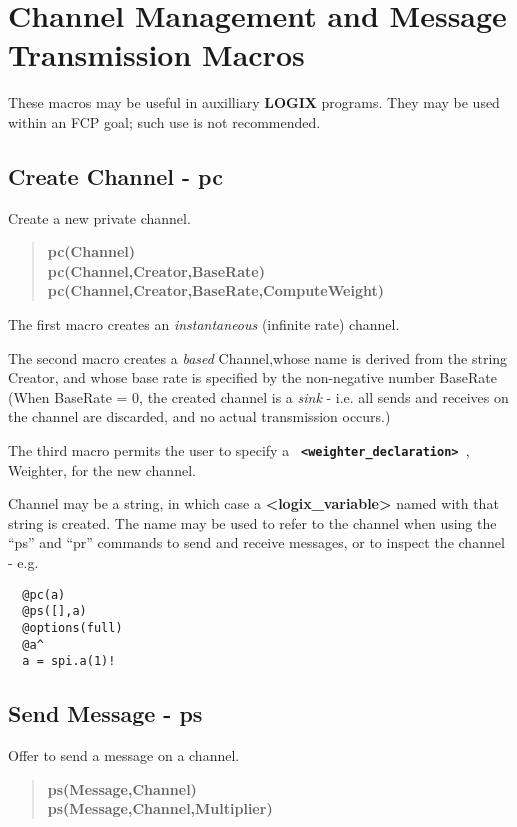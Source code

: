 \documentclass[twoside,10pt]{report}
\begin{document}
\section{Channel Management and Message Transmission Macros}

These macros may be useful in auxilliary {\bf LOGIX} programs.
They may be used within an FCP goal; such use is not recommended.

\subsection{Create Channel - pc}

Create a new private channel.

\begin{verse}
 {\bfseries
pc(Channel) \\
pc(Channel,Creator,BaseRate) \\
pc(Channel,Creator,BaseRate,ComputeWeight)
 }
\end{verse}

\noindent
The first macro creates an {\em instantaneous}
(infinite rate) channel.

\noindent
The second macro creates a {\em based} Channel,whose
name is derived from the string Creator, and whose base rate is specified by
the non-negative number BaseRate (When BaseRate = 0, the created
channel is a {\em sink} -
i.e. all sends and receives on the channel are discarded, and no actual
transmission occurs.)

\noindent
The third macro permits the user to specify a
{\bf \verb+ <weighter_declaration> +}, Weighter, for the new channel.

\noindent
Channel may be a string, in which case a {\bf <logix\_variable>} named with that
string is created.  The name may be used to refer to the channel
when using the ``ps'' and ``pr'' commands to send and receive messages,
or to inspect the channel - e.g.

\begin{verbatim}
  @pc(a)
  @ps([],a)
  @options(full)
  @a^
  a = spi.a(1)!
\end{verbatim}

\subsection{Send Message - ps}

Offer to send a message on a channel.

\begin{verse}
 {\bfseries
ps(Message,Channel) \\
ps(Message,Channel,Multiplier)
 }
\end{verse}
\end{document}
